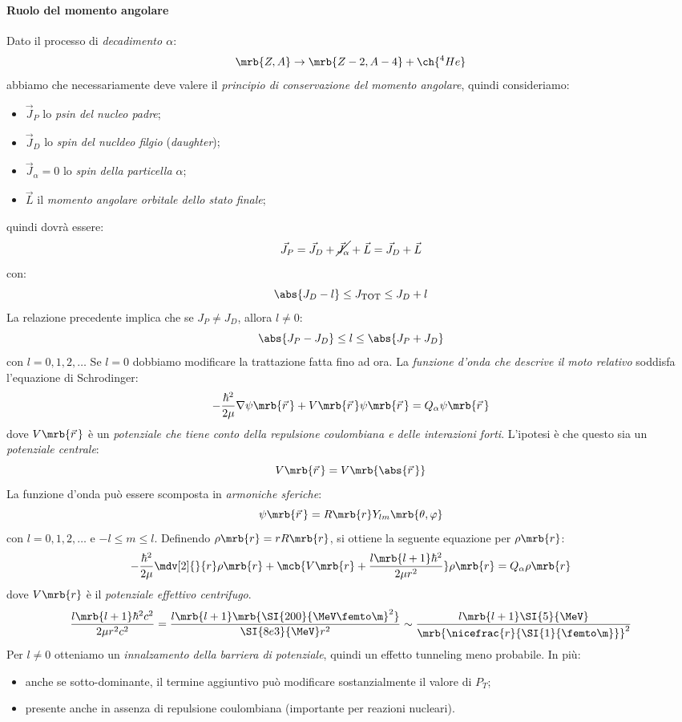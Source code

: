 \paragraph{Ruolo del momento angolare}
Dato il processo di \textit{decadimento $\alpha$}:
\[
  \mrb{Z, A} \rightarrow \mrb{Z - 2, A - 4} + \ch{^{4}He}
\]
abbiamo che necessariamente deve valere il \textit{principio di conservazione
del momento angolare}, quindi consideriamo:
\begin{itemize}
  \item $\vec{J}_{P}$ lo \textit{psin del nucleo padre};
  \item $\vec{J}_{D}$ lo \textit{spin del nucldeo filgio} (\textit{daughter});
  \item $\vec{J}_{\alpha} = 0$ lo \textit{spin della particella $\alpha$};
  \item $\vec{L}$ il \textit{momento angolare orbitale dello stato finale};
\end{itemize}
quindi dovrà essere:
\[
  \vec{J}_{P} = \vec{J}_{D} + \cancel{\vec{J}_{\alpha}} + \vec{L} = \vec{J}_{D}
  + \vec{L}
\]
con:
\[
  \abs{J_D - l} \leq J _\text{TOT} \leq J_D + l
\]
La relazione precedente implica che se $J_P \neq J_D$, allora $l \neq 0$:
\[
  \abs{J_P - J_D} \leq l \leq \abs{J_P + J_D}
\]
con $l = 0, 1, 2, \dots$
Se $l = 0$ dobbiamo modificare la trattazione fatta fino ad ora.
La \textit{funzione d'onda che descrive il moto relativo} soddisfa l'equazione
di Schrodinger:
\[
  - \frac{\hbar^2}{2 \mu} \nabla \psi \mrb{\vec{r}\,} + V \mrb{\vec{r}\,} \psi
  \mrb{\vec{r}\,} = Q _{\alpha} \psi \mrb{\vec{r}\,}
\]
dove $V \mrb{\vec{r}\,}$ è un \textit{potenziale che tiene conto della
repulsione coulombiana e delle interazioni forti}. L'ipotesi è che questo sia
un \textit{potenziale centrale}:
\[
  V \mrb{\vec{r}\,} = V \mrb{\abs{\vec{r}\,}}
\]
La funzione d'onda può essere scomposta in \textit{armoniche sferiche}:
\[
  \psi \mrb{\vec{r}\,} = R \mrb{r} Y _{lm} \mrb{\theta, \varphi}
\]
con $l = 0, 1, 2, \dots$ e $-l \leq m \leq l$.
Definendo $\rho \mrb{r} = r R \mrb{r}$, si ottiene la seguente equazione per
$\rho \mrb{r}$:
\[
  - \frac{\hbar^2}{2 \mu} \mdv[2]{}{r} \rho \mrb{r} + \mcb{V \mrb{r} + \frac{l
  \mrb{l + 1} \hbar^2}{2 \mu r^2}} \rho \mrb{r} = Q _{\alpha} \rho \mrb{r}
\]
dove $V \mrb{r}$ è il \textit{potenziale effettivo centrifugo}.
\[
  \frac{l \mrb{l + 1} \hbar^2 c^2}{2 \mu r^2 c^2} = \frac{l \mrb{l + 1}
  \mrb{\SI{200}{\MeV \femto\m}^{2}}}{\SI{8e3}{\MeV} r^2} \sim \frac{l \mrb{l +
  1} \SI{5}{\MeV}}{\mrb{\nicefrac{r}{\SI{1}{\femto\m}}}^{2}}
\]
Per $l \neq 0$ otteniamo un \textit{innalzamento della barriera di potenziale},
quindi un effetto tunneling meno probabile. In più:
\begin{itemize}
  \item anche se sotto-dominante, il termine aggiuntivo può modificare
    sostanzialmente il valore di $P_T$;
  \item {} presente anche in assenza di
    repulsione coulombiana (importante per reazioni nucleari).
\end{itemize}
